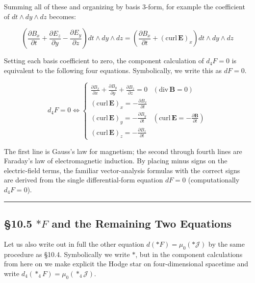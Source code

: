 Summing all of these and organizing by basis \(3\)-form, for example the
coefficient of \(dt\wedge dy\wedge dz\) becomes:

\[
\left(\frac{\partial B_x}{\partial t} + \frac{\partial E_z}{\partial y} - \frac{\partial E_y}{\partial z}\right) dt\wedge dy\wedge dz = \left(\frac{\partial B_x}{\partial t} + (\mathrm{curl}\,\mathbf{E})_x\right) dt\wedge dy\wedge dz
\]

Setting each basis coefficient to zero, the component calculation of
\(d_4F=0\) is equivalent to the following four equations. Symbolically,
we write this as \(dF=0\).

\[d_4F = 0 \Longleftrightarrow \begin{cases}
\displaystyle \frac{\partial B_x}{\partial x} + \frac{\partial B_y}{\partial y} + \frac{\partial B_z}{\partial z} = 0 & (\mathrm{div}\,\mathbf{B} = 0) \\[1em]
\displaystyle (\mathrm{curl}\,\mathbf{E})_x = -\frac{\partial B_x}{\partial t} & \\[0.5em]
\displaystyle (\mathrm{curl}\,\mathbf{E})_y = -\frac{\partial B_y}{\partial t} & (\mathrm{curl}\,\mathbf{E} = -\frac{\partial\mathbf{B}}{\partial t}) \\[0.5em]
\displaystyle (\mathrm{curl}\,\mathbf{E})_z = -\frac{\partial B_z}{\partial t} &
\end{cases}\]

The first line is Gauss's law for magnetism; the second through fourth
lines are Faraday's law of electromagnetic induction. By placing minus
signs on the electric-field terms, the familiar vector-analysis formulas
with the correct signs are derived from the single differential-form
equation \(dF=0\) (computationally \(d_4F=0\)).

\begin{center}\rule{0.5\linewidth}{0.5pt}\end{center}

\hypertarget{ast-f-and-the-remaining-two-equations}{%
\subsection{\texorpdfstring{§10.5 \(\ast F\) and the Remaining Two
Equations}{§10.5 \textbackslash ast F and the Remaining Two Equations}}\label{ast-f-and-the-remaining-two-equations}}

Let us also write out in full the other equation
\(d(\ast F) = \mu_0(\ast\mathcal{J})\) by the same procedure as §10.4.
Symbolically we write \(\ast\), but in the component calculations from
here on we make explicit the Hodge star on four-dimensional spacetime
and write \(d_4(\ast_4F)=\mu_0(\ast_4\mathcal{J})\).

